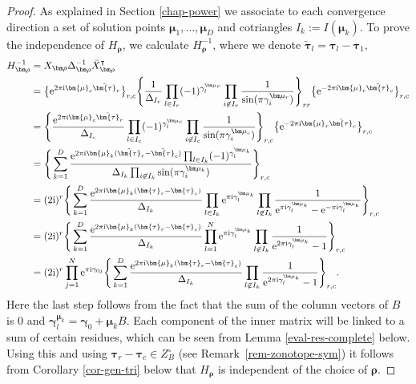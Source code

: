 \begin{proof}
As explained in Section \ref{chap-power} we associate to each convergence direction a set of solution points $\bm{\mu}_1,\dots,\bm{\mu}_D$ and cotriangles $I_k := I(\bm{\mu}_k).$ To prove the independence of $H_{\bm\rho}$,
we calculate $H^{-1}_{\bm\rho}$, where we denote $\tilde{\bm{\tau}}_l = \bm{\tau}_l - \bm{\tau}_1$,
\begin{align*}
H_{\bm\rho}^{-1}&= X_{\bm\rho} \Delta_{\bm\rho}^{-1} \bar{X}_{\bm\rho}^{\intercal}\\
&= \big\{{\rm e}^{2\pi {\rm i}\bm{\mu}_c \tilde{\bm{\tau}}_r}\big\}_{r,c}
\Bigg\{\frac{1}{\Delta_{I_r}} \prod_{l \in I_r} (-1)^{\gamma_l^{\bm\mu_r}}\prod_{i \not \in I_r} \frac{1}{\sin(\pi \gamma_i^{\bm\mu_r})}\Bigg\}_{rr}
\big\{{\rm e}^{-2\pi {\rm i}\bm{\mu}_r \tilde{\bm{\tau}}_c}\big\}_{r,c}
\\
&= \Bigg\{\frac{{\rm e}^{2\pi {\rm i}\bm{\mu}_c \tilde{\bm{\tau}}_r}}{\Delta_{I_c}} \prod_{l \in I_c} (-1)^{\gamma_l^{\bm\mu_c}}\prod_{i \not \in I_c} \frac{1}{\sin(\pi \gamma_i^{\bm\mu_c})}\Bigg\}_{r,c}
\big\{{\rm e}^{-2\pi {\rm i}\bm{\mu}_r \tilde{\bm{\tau}}_c}\big\}_{r,c}
\\
&= \Bigg\{\sum_{k=1}^D \frac{{\rm e}^{2\pi {\rm i}\bm{\mu}_k (\tilde{\bm{\tau}}_r - \tilde{\bm{\tau}}_c)}\prod_{l \in I_k} (-1)^{\gamma_l^{\bm\mu_k}}}{\Delta_{I_k}\prod_{i \not \in I_k} \sin(\pi \gamma_i^{\bm\mu_k})} \Bigg\}_{r,c}\\
&=(2{\rm i})^r\Bigg\{\sum_{k=1}^D \frac{{\rm e}^{2\pi {\rm i}\bm{\mu}_k (\bm{\tau}_r - \bm{\tau}_c)}}{\Delta_{I_k}}\prod_{l \in I_k} {\rm e}^{\pi {\rm i} \gamma_l^{\bm\mu_k}}\prod_{l \not \in I_k} \frac{1}{{\rm e}^{\pi {\rm i} \gamma_l^{\bm\mu_k}} - {\rm e}^{-\pi {\rm i} \gamma_l^{\bm\mu_k}}} \Bigg\}_{r,c} \\
&= (2{\rm i})^r \Bigg\{\sum_{k=1}^D \frac{{\rm e}^{2\pi {\rm i}\bm{\mu}_k (\bm{\tau}_r - \bm{\tau}_c)}}{\Delta_{I_k}}\prod_{l = 1}^N {\rm e}^{\pi {\rm i} \gamma_l^{\bm\mu_k}}\prod_{l \not \in I_k} \frac{1}{{\rm e}^{2\pi {\rm i} \gamma_l^{\bm\mu_k}} - 1} \Bigg\}_{r,c} \\
&= (2{\rm i})^r \prod_{j=1}^N {\rm e}^{\pi {\rm i} \gamma_{0j}}\Bigg\{\sum_{k=1}^D \frac{{\rm e}^{2\pi {\rm i}\bm{\mu}_k (\bm{\tau}_r - \bm{\tau}_c)}}{\Delta_{I_k}}\prod_{l \not \in I_k} \frac{1}{{\rm e}^{2\pi {\rm i} \gamma_l^{\bm\mu_k}} - 1} \Bigg\}_{r,c}.
\end{align*}
Here the last step follows from the fact that the sum of the column vectors of $B$ is $0$ and $\bm\gamma_l^{\bm \mu_k} = \bm\gamma_0 + \bm{\mu}_kB$.
Each component of the inner matrix will be linked to a sum of certain residues, which can be seen from Lemma \ref{eval-res-complete} below. Using this and using
$\bm{\tau}_{r} - \bm{\tau}_{c} \in Z_B^{\circ}$ (see Remark~\ref{rem-zonotope-sym}) it follows from Corollary \ref{cor-gen-tri} below that $H_{\bm\rho}$ is independent of the choice
of $\bm\rho$.
\end{proof}

